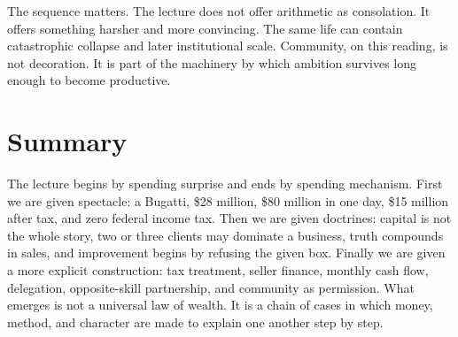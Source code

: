 The sequence matters. The lecture does not offer arithmetic as consolation. It offers something harsher and more convincing. The same life can contain catastrophic collapse and later institutional scale. Community, on this reading, is not decoration. It is part of the machinery by which ambition survives long enough to become productive.

\section{Summary}

The lecture begins by spending surprise and ends by spending mechanism. First we are given spectacle: a Bugatti, \$28 million, \$80 million in one day, \$15 million after tax, and zero federal income tax. Then we are given doctrines: capital is not the whole story, two or three clients may dominate a business, truth compounds in sales, and improvement begins by refusing the given box. Finally we are given a more explicit construction: tax treatment, seller finance, monthly cash flow, delegation, opposite-skill partnership, and community as permission. What emerges is not a universal law of wealth. It is a chain of cases in which money, method, and character are made to explain one another step by step.
